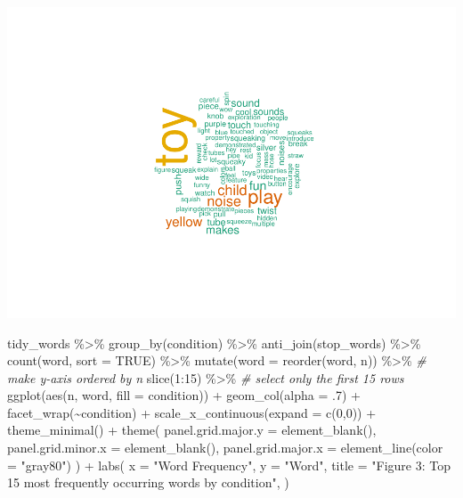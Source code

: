 \documentclass[
  english,
  man]{apa6}
\newenvironment{Shaded}{\begin{snugshade}}{\end{snugshade}}
\newcommand{\AttributeTok}[1]{\textcolor[rgb]{0.77,0.63,0.00}{#1}}
\newcommand{\CommentTok}[1]{\textcolor[rgb]{0.56,0.35,0.01}{\textit{#1}}}
\newcommand{\ConstantTok}[1]{\textcolor[rgb]{0.00,0.00,0.00}{#1}}
\newcommand{\DecValTok}[1]{\textcolor[rgb]{0.00,0.00,0.81}{#1}}
\newcommand{\FunctionTok}[1]{\textcolor[rgb]{0.00,0.00,0.00}{#1}}
\newcommand{\NormalTok}[1]{#1}
\newcommand{\SpecialCharTok}[1]{\textcolor[rgb]{0.00,0.00,0.00}{#1}}
\newcommand{\StringTok}[1]{\textcolor[rgb]{0.31,0.60,0.02}{#1}}
\begin{document}
\includegraphics{capstone640_files/figure-latex/word cloud-1.pdf}

\begin{Shaded}
\begin{Highlighting}[]
\NormalTok{tidy\_words }\SpecialCharTok{\%\textgreater{}\%} 
  \FunctionTok{group\_by}\NormalTok{(condition) }\SpecialCharTok{\%\textgreater{}\%}
  \FunctionTok{anti\_join}\NormalTok{(stop\_words) }\SpecialCharTok{\%\textgreater{}\%} 
  \FunctionTok{count}\NormalTok{(word, }\AttributeTok{sort =} \ConstantTok{TRUE}\NormalTok{) }\SpecialCharTok{\%\textgreater{}\%} 
  \FunctionTok{mutate}\NormalTok{(}\AttributeTok{word =} \FunctionTok{reorder}\NormalTok{(word, n)) }\SpecialCharTok{\%\textgreater{}\%} \CommentTok{\# make y{-}axis ordered by n}
  \FunctionTok{slice}\NormalTok{(}\DecValTok{1}\SpecialCharTok{:}\DecValTok{15}\NormalTok{) }\SpecialCharTok{\%\textgreater{}\%} \CommentTok{\# select only the first 15 rows}
  \FunctionTok{ggplot}\NormalTok{(}\FunctionTok{aes}\NormalTok{(n, word, }\AttributeTok{fill =}\NormalTok{ condition)) }\SpecialCharTok{+}
  \FunctionTok{geom\_col}\NormalTok{(}\AttributeTok{alpha =}\NormalTok{ .}\DecValTok{7}\NormalTok{) }\SpecialCharTok{+}
  \FunctionTok{facet\_wrap}\NormalTok{(}\SpecialCharTok{\textasciitilde{}}\NormalTok{condition) }\SpecialCharTok{+}
  \FunctionTok{scale\_x\_continuous}\NormalTok{(}\AttributeTok{expand =} \FunctionTok{c}\NormalTok{(}\DecValTok{0}\NormalTok{,}\DecValTok{0}\NormalTok{)) }\SpecialCharTok{+}
  \FunctionTok{theme\_minimal}\NormalTok{() }\SpecialCharTok{+}
  \FunctionTok{theme}\NormalTok{(}
    \AttributeTok{panel.grid.major.y =} \FunctionTok{element\_blank}\NormalTok{(),}
    \AttributeTok{panel.grid.minor.x =} \FunctionTok{element\_blank}\NormalTok{(),}
    \AttributeTok{panel.grid.major.x =} \FunctionTok{element\_line}\NormalTok{(}\AttributeTok{color =} \StringTok{"gray80"}\NormalTok{)}
\NormalTok{  ) }\SpecialCharTok{+}
  \FunctionTok{labs}\NormalTok{(}
    \AttributeTok{x =} \StringTok{"Word Frequency"}\NormalTok{,}
    \AttributeTok{y =} \StringTok{"Word"}\NormalTok{,}
    \AttributeTok{title =} \StringTok{"Figure 3: Top 15 most frequently occurring words by condition"}\NormalTok{,}
\NormalTok{  )}
\end{Highlighting}
\end{Shaded}
\end{document}
